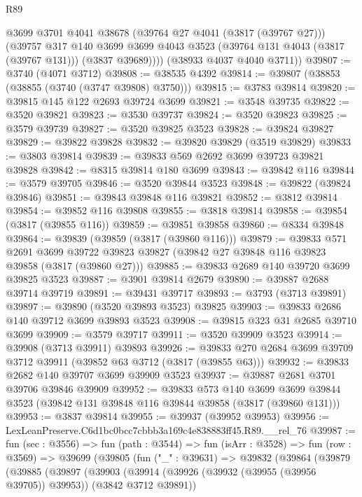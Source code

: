 \begin{lexlean}{R89}
\begin{coremodule}
          @3699
          @3701
          @4041
          @38678
          (@39764 @27 @4041 (@3817 (@39767 @27)))
          (@39757
            @317
            @140
            @3699
            @3699
            @4043
            @3523
            (@39764 @131 @4043 (@3817 (@39767 @131)))
            (@3837 @39689))))
      (@38933 @4037 @4040 @3711))
@39807 := @3740 (@4071 @3712)
@39808 := @38535 @4392
@39814 := @39807 (@38853 (@38855 (@3740 (@3747 @39808) @3750)))
@39815 := @3783 @39814
@39820 := @39815 @145 @122 @2693 @39724 @3699
@39821 := @3548 @39735
@39822 := @3520 @39821
@39823 := @3530 @39737
@39824 := @3520 @39823
@39825 := @3579 @39739
@39827 := @3520 @39825 @3523
@39828 := @39824 @39827
@39829 := @39822 @39828
@39832 := @39820 @39829 (@3519 @39829)
@39833 := @3803 @39814
@39839 := @39833 @569 @2692 @3699 @39723 @39821 @39828
@39842 := @8315 @39814 @180 @3699
@39843 := @39842 @116
@39844 := @3579 @39705
@39846 := @3520 @39844 @3523
@39848 := @39822 (@39824 @39846)
@39851 := @39843 @39848 @116 @39821
@39852 := @3812 @39814
@39854 := @39852 @116 @39808
@39855 := @3818 @39814
@39858 := @39854 (@3817 (@39855 @116))
@39859 := @39851 @39858
@39860 := @8334 @39848
@39864 := @39839 (@39859 (@3817 (@39860 @116)))
@39879 := @39833
    @571
    @2691
    @3699
    @39722
    @39823
    @39827
    (@39842 @27 @39848 @116 @39823 @39858 (@3817 (@39860 @27)))
@39885 := @39833 @2689 @140 @39720 @3699 @39825 @3523
@39887 := @3901 @39814 @2679
@39890 := @39887 @2688 @39714 @39719
@39891 := @39431 @39717
@39893 := @3793 (@3713 @39891)
@39897 := @39890 (@3520 @39893 @3523) @39825
@39903 := @39833 @2686 @140 @39712 @3699 @39893 @3523
@39908 := @39815 @323 @31 @2685 @39710 @3699
@39909 := @3579 @39717
@39911 := @3520 @39909 @3523
@39914 := @39908 (@3713 @39911) @39893
@39926 := @39833 @270 @2684 @3699 @39709 @3712 @39911 (@39852 @63 @3712 (@3817 (@39855 @63)))
@39932 := @39833 @2682 @140 @39707 @3699 @39909 @3523
@39937 := @39887 @2681 @3701 @39706 @39846 @39909
@39952 := @39833
    @573
    @140
    @3699
    @3699
    @39844
    @3523
    (@39842 @131 @39848 @116 @39844 @39858 (@3817 (@39860 @131)))
@39953 := @3837 @39814
@39955 := @39937 (@39952 @39953)
@39956 := LexLeanPreserve.C6d1bc0bcc7cbbb3a169c4e838883ff45.R89.__rel_76
@39987 := fun (sec : @3556) =>
  fun (path : @3544) =>
  fun (isArr : @3528) =>
  fun (row : @3569) =>
  @39699
    (@39805
      (fun ("_" : @39631) =>
      @39832
        (@39864
          (@39879
            (@39885
              (@39897
                (@39903
                  (@39914 (@39926 (@39932 (@39955 (@39956 @39705)) @39953)) (@3842 @3712 @39891))

\end{coremodule}
\end{lexlean}
